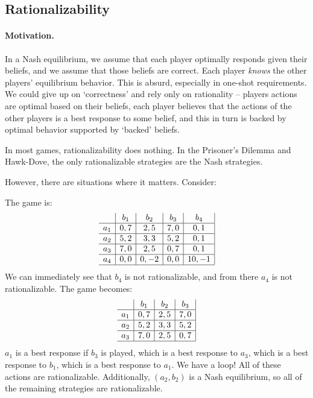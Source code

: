 \documentclass[10pt]{article}
\begin{document}
\subsection{Rationalizability}

\paragraph{Motivation.} In a Nash equilibrium, we assume that each player optimally responds given their beliefs, and we assume that those beliefs are correct. Each player \emph{knows} the other players' equilibrium behavior. This is absurd, especially in one-shot requirements. We could give up on `correctness' and rely only on rationality -- players actions are optimal based on their beliefs, each player believes that the actions of the other players is a best response to some belief, and this in turn is backed by optimal behavior supported by `backed' beliefs.

\begin{remark}
	In most games, rationalizability does nothing. In the Prisoner's Dilemma and Hawk-Dove, the only rationalizable strategies are the Nash strategies.
\end{remark}

However, there are situations where it matters. Consider:

\begin{example}
	 The game is: 
	\[
	\begin{array}{c|c|c|c|c|}
		& b_1 & b_2 & b_3 & b_4 \\\hline
		a_1 & 0,7 & 2,5 & 7,0 & 0,1 \\\hline 
		a_2 & 5,2 & 3,3 & 5,2 & 0,1 \\\hline 
		a_3 & 7,0 & 2,5 & 0,7 & 0,1 \\\hline 
		a_4 & 0,0 & 0,-2 & 0,0 & 10,-1 \\\hline 
	\end{array}
	\]
	We can immediately see that $b_4$ is not rationalizable, and from there $a_4$ is not rationalizable. The game becomes:
	\[
	\begin{array}{c|c|c|c|}
		& b_1 & b_2 & b_3  \\\hline
		a_1 & 0,7 & 2,5 & 7,0 \\\hline 
		a_2 & 5,2 & 3,3 & 5,2  \\\hline 
		a_3 & 7,0 & 2,5 & 0,7  \\\hline 
	\end{array}
	\]
	$a_1$ is a best response if $b_3$ is played, which is a best response to $a_3$, which is a best response to $b_1$, which is a best response to $a_1$. We have a loop! All of these actions are rationalizable. Additionally, $(a_2,b_2)$ is a Nash equilibrium, so all of the remaining strategies are rationalizable. 
\end{example}
\end{document}
